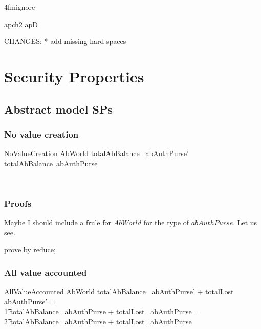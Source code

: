 \ai4fmignore{
\begin{zsection}
  \SECTION apch2 \parents apD
\end{zsection}
CHANGES:
* add missing hard spaces
}
\chapter[SPs]{Security Properties}\label{apch2}

\section{Abstract model SPs}

\subsection{No value creation}

\begin{LSDef}
\begin{schema}{NoValueCreation}
   \Delta AbWorld
\where
   totalAbBalance~ abAuthPurse' \leq totalAbBalance~abAuthPurse
\end{schema}~\end{LSDef}

\subsection*{Proofs}

Maybe I should include a frule for $AbWorld$ for the type of
$abAuthPurse$. Let us see.
\begin{LDCheck}\begin{zproof}
   prove by reduce;
\end{zproof}\end{LDCheck}

\subsection{All value accounted}

\begin{LSDef}
\begin{schema}{AllValueAccounted}
   \Delta AbWorld
\where
   totalAbBalance~ abAuthPurse' + totalLost~ abAuthPurse' = \\
      \t1 totalAbBalance~ abAuthPurse + totalLost~ abAuthPurse = \\
          \t2 totalAbBalance~ abAuthPurse + totalLost~ abAuthPurse
\end{schema}~\end{LSDef}

